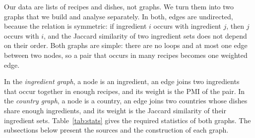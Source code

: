 Our data are lists of recipes and dishes, not graphs. We turn them into two
graphs that we build and analyse separately. In both, edges are undirected,
because the relation is symmetric: if ingredient $i$ occurs with ingredient
$j$, then $j$ occurs with $i$, and the Jaccard similarity of two ingredient
sets does not depend on their order. Both graphs are simple: there are no
loops and at most one edge between two nodes, so a pair that occurs in many
recipes becomes one weighted edge.

In the \emph{ingredient graph}, a node is an ingredient, an edge joins two
ingredients that occur together in enough recipes, and its weight is the
PMI of the pair. In the \emph{country graph},
a node is a country, an edge joins two countries whose dishes share enough
ingredients, and its weight is the Jaccard similarity of their ingredient
sets. Table~\ref{tab:stats} gives the required statistics of both graphs. The
subsections below present the sources and the construction of each graph.
